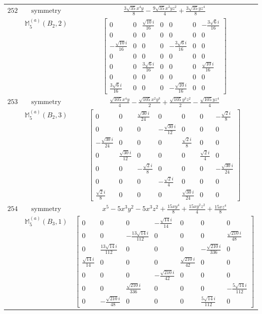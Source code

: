 \documentclass[fleqn,8pt,landscape]{jsarticle}
\begin{document}
\begin{longtable}{ccc}
$ 252 $ & $ \text{symmetry} $ & $ \frac{3 \sqrt{35} x^{4} y}{8} - \frac{9 \sqrt{35} x^{2} y z^{2}}{4} + \frac{3 \sqrt{35} y z^{4}}{8} $ \\
$  $ & $ \mathbb{M}_{5}^{(a)}(B_{2},2) $ & $ \begin{bmatrix} 0 & 0 & \frac{\sqrt{10} i}{16} & 0 & 0 & 0 & - \frac{3 \sqrt{6} i}{16} \\ 0 & 0 & 0 & 0 & 0 & 0 & 0 \\ - \frac{\sqrt{10} i}{16} & 0 & 0 & 0 & - \frac{3 \sqrt{6} i}{16} & 0 & 0 \\ 0 & 0 & 0 & 0 & 0 & 0 & 0 \\ 0 & 0 & \frac{3 \sqrt{6} i}{16} & 0 & 0 & 0 & \frac{\sqrt{10} i}{16} \\ 0 & 0 & 0 & 0 & 0 & 0 & 0 \\ \frac{3 \sqrt{6} i}{16} & 0 & 0 & 0 & - \frac{\sqrt{10} i}{16} & 0 & 0 \end{bmatrix} $ \\ \hline
$ 253 $ & $ \text{symmetry} $ & $ \frac{\sqrt{105} x^{4} y}{4} - \frac{\sqrt{105} x^{2} y^{3}}{2} + \frac{\sqrt{105} y^{3} z^{2}}{2} - \frac{\sqrt{105} y z^{4}}{4} $ \\
$  $ & $ \mathbb{M}_{5}^{(a)}(B_{2},3) $ & $ \begin{bmatrix} 0 & 0 & \frac{\sqrt{30} i}{24} & 0 & 0 & 0 & - \frac{\sqrt{2} i}{8} \\ 0 & 0 & 0 & - \frac{\sqrt{30} i}{12} & 0 & 0 & 0 \\ - \frac{\sqrt{30} i}{24} & 0 & 0 & 0 & \frac{\sqrt{2} i}{8} & 0 & 0 \\ 0 & \frac{\sqrt{30} i}{12} & 0 & 0 & 0 & \frac{\sqrt{2} i}{4} & 0 \\ 0 & 0 & - \frac{\sqrt{2} i}{8} & 0 & 0 & 0 & - \frac{\sqrt{30} i}{24} \\ 0 & 0 & 0 & - \frac{\sqrt{2} i}{4} & 0 & 0 & 0 \\ \frac{\sqrt{2} i}{8} & 0 & 0 & 0 & \frac{\sqrt{30} i}{24} & 0 & 0 \end{bmatrix} $ \\ \hline
$ 254 $ & $ \text{symmetry} $ & $ x^{5} - 5 x^{3} y^{2} - 5 x^{3} z^{2} + \frac{15 x y^{4}}{8} + \frac{15 x y^{2} z^{2}}{4} + \frac{15 x z^{4}}{8} $ \\
$  $ & $ \mathbb{M}_{5}^{(a)}(B_{3},1) $ & $ \begin{bmatrix} 0 & 0 & 0 & - \frac{\sqrt{14} i}{14} & 0 & 0 & 0 \\ 0 & 0 & - \frac{13 \sqrt{14} i}{112} & 0 & 0 & 0 & \frac{\sqrt{210} i}{48} \\ 0 & \frac{13 \sqrt{14} i}{112} & 0 & 0 & 0 & - \frac{\sqrt{210} i}{336} & 0 \\ \frac{\sqrt{14} i}{14} & 0 & 0 & 0 & \frac{\sqrt{210} i}{42} & 0 & 0 \\ 0 & 0 & 0 & - \frac{\sqrt{210} i}{42} & 0 & 0 & 0 \\ 0 & 0 & \frac{\sqrt{210} i}{336} & 0 & 0 & 0 & - \frac{5 \sqrt{14} i}{112} \\ 0 & - \frac{\sqrt{210} i}{48} & 0 & 0 & 0 & \frac{5 \sqrt{14} i}{112} & 0 \end{bmatrix} $ \\ \hline

\end{longtable}
\end{document}
